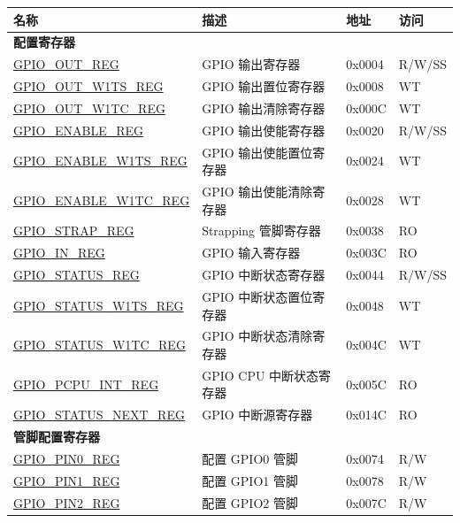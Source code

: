 \begin{longtable}{ | p{6cm} | p{6.7cm} | p{1.3cm} | p{1.5cm} | }
\hline\rowcolor{lightgray}
名称 & 描述 & 地址 & 访问 \\ \hline
\endhead
\multicolumn{4}{|l|}{\textbf{配置寄存器}} \\ \hline
\hyperref[regdesc:GPIOOUTREG]{GPIO\_OUT\_REG} & GPIO 输出寄存器 & 0x0004 & R/W/SS \\ \hline
\hyperref[regdesc:GPIOOUTW1TSREG]{GPIO\_OUT\_W1TS\_REG} & GPIO 输出置位寄存器 & 0x0008 & WT \\ \hline
\hyperref[regdesc:GPIOOUTW1TCREG]{GPIO\_OUT\_W1TC\_REG} & GPIO 输出清除寄存器 & 0x000C & WT \\ \hline
\hyperref[regdesc:GPIOENABLEREG]{GPIO\_ENABLE\_REG} & GPIO 输出使能寄存器 & 0x0020 & R/W/SS \\ \hline
\hyperref[regdesc:GPIOENABLEW1TSREG]{GPIO\_ENABLE\_W1TS\_REG} & GPIO 输出使能置位寄存器 & 0x0024 & WT \\ \hline
\hyperref[regdesc:GPIOENABLEW1TCREG]{GPIO\_ENABLE\_W1TC\_REG} & GPIO 输出使能清除寄存器 & 0x0028 & WT \\ \hline
\hyperref[regdesc:GPIOSTRAPREG]{GPIO\_STRAP\_REG} & Strapping 管脚寄存器 & 0x0038 & RO \\ \hline
\hyperref[regdesc:GPIOINREG]{GPIO\_IN\_REG} & GPIO 输入寄存器 & 0x003C & RO \\ \hline
\hyperref[regdesc:GPIOSTATUSREG]{GPIO\_STATUS\_REG} & GPIO 中断状态寄存器 & 0x0044 & R/W/SS \\ \hline
\hyperref[regdesc:GPIOSTATUSW1TSREG]{GPIO\_STATUS\_W1TS\_REG} & GPIO 中断状态置位寄存器 & 0x0048 & WT \\ \hline
\hyperref[regdesc:GPIOSTATUSW1TCREG]{GPIO\_STATUS\_W1TC\_REG} & GPIO 中断状态清除寄存器 & 0x004C & WT \\ \hline
\hyperref[regdesc:GPIOPCPUINTREG]{GPIO\_PCPU\_INT\_REG} & GPIO CPU 中断状态寄存器 & 0x005C & RO \\ \hline
\hyperref[regdesc:GPIOSTATUSNEXTREG]{GPIO\_STATUS\_NEXT\_REG} & GPIO 中断源寄存器 & 0x014C & RO \\ \hline
\multicolumn{4}{|l|}{\textbf{管脚配置寄存器}} \\ \hline
\hyperref[regdesc:GPIOPINNREG]{GPIO\_PIN0\_REG} & 配置 GPIO0 管脚& 0x0074 & R/W \\ \hline
\hyperref[regdesc:GPIOPINNREG]{GPIO\_PIN1\_REG} & 配置 GPIO1 管脚& 0x0078 & R/W \\ \hline
\hyperref[regdesc:GPIOPINNREG]{GPIO\_PIN2\_REG} & 配置 GPIO2 管脚& 0x007C & R/W \\ \hline

\end{longtable}
